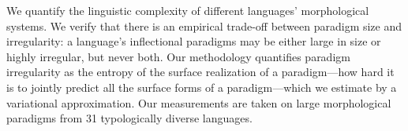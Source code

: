 We quantify the linguistic complexity of different languages’ morphological systems. We verify that there is an empirical trade-off between paradigm size and irregularity: a language’s inflectional paradigms may be either large in size or highly irregular, but never both. Our methodology quantifies paradigm irregularity as the entropy of the surface realization of a paradigm—how hard it is to jointly predict all the surface forms of a paradigm—which we estimate by a variational approximation. Our measurements are taken on large morphological paradigms from 31 typologically diverse languages.